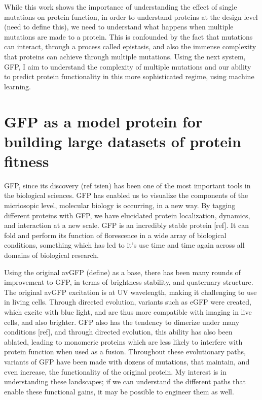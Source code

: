 While this work shows the importance of understanding the effect of single mutations on protein function, in order to understand proteins at the design level (need to define this), we need to understand what happens when multiple mutations are made to a protein. This is confounded by the fact that mutations can interact, through a process called epistasis, and also the immense complexity that proteins can achieve through multiple mutations. Using the next system, GFP, I aim to understand the complexity of multiple mutations and our ability to predict protein functionality in this more sophisticated regime, using machine learning.

\section{GFP as a model protein for building large datasets of protein fitness}

GFP, since its discovery (ref tsien) has been one of the most important tools in the biological sciences. GFP has enabled us to visualize the components of the micriosopic level, molecular biology is occurring, in a new way. By tagging different proteins with GFP, we have elucidated protein localization, dynamics, and interaction at a new scale. GFP is an incredibly stable protein [ref]. It can fold and perform its function of florescence in a wide array of biological conditions, something which has led to it’s use time and time again across all domains of biological research.

Using the original avGFP (define) as a base, there has been many rounds of improvement to GFP, in terms of brightness stability, and quaternary structure. The original avGFP excitation is at UV wavelength, making it challenging to use in living cells. Through directed evolution, variants such as eGFP were created, which excite with blue light, and are thus more compatible with imaging in live cells, and also brighter. GFP also has the tendency to dimerize under many conditions [ref], and through directed evolution, this ability has also been ablated, leading to monomeric proteins which are less likely to interfere with protein function when used as a fusion. Throughout these evolutionary paths, variants of GFP have been made with dozens of mutations, that maintain, and even increase, the functionality of the original protein. My interest is in understanding these landscapes; if we can understand the different paths that enable these functional gains, it may be possible to engineer them as well. 

